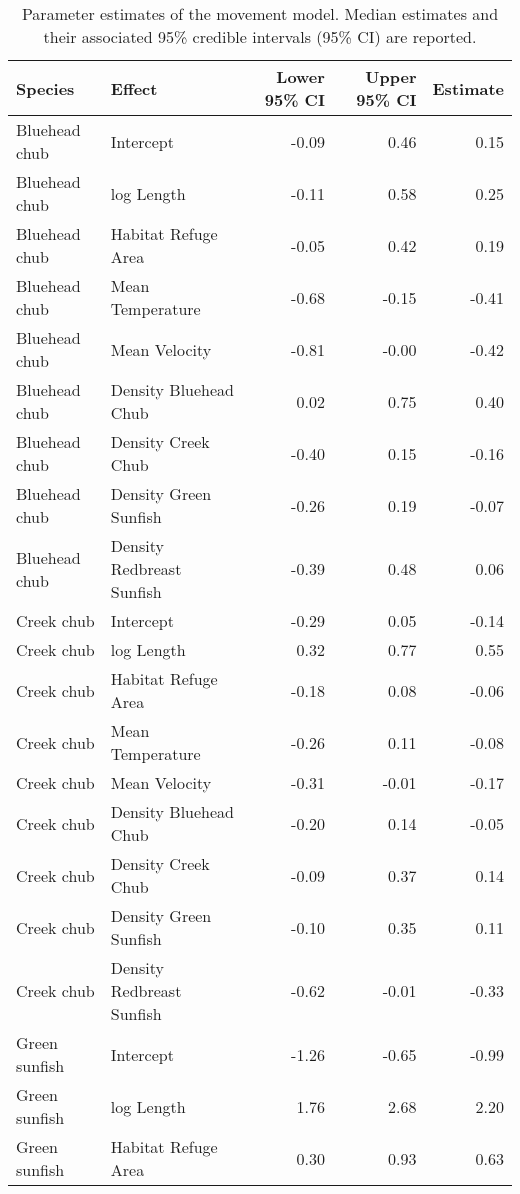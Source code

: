 \begin{table}[ht]
\centering
\caption{Parameter estimates of the movement model. Median estimates and their associated 95\% credible intervals (95\% CI) are reported.} 
\label{tab:coefficients}
\begin{tabular}{llrrr}
  \hline
Species & Effect & Lower 95\% CI & Upper 95\% CI & Estimate \\ 
  \hline
Bluehead chub & Intercept & -0.09 & 0.46 & 0.15 \\ 
  Bluehead chub & log Length & -0.11 & 0.58 & 0.25 \\ 
  Bluehead chub & Habitat Refuge Area & -0.05 & 0.42 & 0.19 \\ 
  Bluehead chub & Mean Temperature & -0.68 & -0.15 & -0.41 \\ 
  Bluehead chub & Mean Velocity & -0.81 & -0.00 & -0.42 \\ 
  Bluehead chub & Density Bluehead Chub & 0.02 & 0.75 & 0.40 \\ 
  Bluehead chub & Density Creek Chub & -0.40 & 0.15 & -0.16 \\ 
  Bluehead chub & Density Green Sunfish & -0.26 & 0.19 & -0.07 \\ 
  Bluehead chub & Density Redbreast Sunfish & -0.39 & 0.48 & 0.06 \\ 
  Creek chub & Intercept & -0.29 & 0.05 & -0.14 \\ 
  Creek chub & log Length & 0.32 & 0.77 & 0.55 \\ 
  Creek chub & Habitat Refuge Area & -0.18 & 0.08 & -0.06 \\ 
  Creek chub & Mean Temperature & -0.26 & 0.11 & -0.08 \\ 
  Creek chub & Mean Velocity & -0.31 & -0.01 & -0.17 \\ 
  Creek chub & Density Bluehead Chub & -0.20 & 0.14 & -0.05 \\ 
  Creek chub & Density Creek Chub & -0.09 & 0.37 & 0.14 \\ 
  Creek chub & Density Green Sunfish & -0.10 & 0.35 & 0.11 \\ 
  Creek chub & Density Redbreast Sunfish & -0.62 & -0.01 & -0.33 \\ 
  Green sunfish & Intercept & -1.26 & -0.65 & -0.99 \\ 
  Green sunfish & log Length & 1.76 & 2.68 & 2.20 \\ 
  Green sunfish & Habitat Refuge Area & 0.30 & 0.93 & 0.63 \\ 

\end{tabular}
\end{table}
